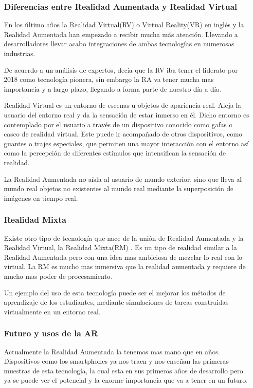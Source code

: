\subsubsection{Diferencias entre Realidad Aumentada y Realidad Virtual}
En los último años la Realidad Virtual(RV) \cite{URL::VR} o Virtual Reality(VR) en inglés y la Realidad Aumentada han empezado a recibir mucha más atención. Llevando a desarrolladores llevar acabo integraciones de ambas tecnologías en numerosas industrias.

De acuerdo a un análisis de expertos, decía que la RV iba tener el liderato por 2018 como tecnología pionera, sin embargo la RA va tener mucha mas importancia y a largo plazo, llegando a forma parte de nuestro día a día.

Realidad Virtual es un entorno de escenas u objetos de apariencia real. Aleja la usuario del entorno real y da la sensación de estar inmerso en él. Dicho entorno es contemplado por el usuario a través de un dispositivo conocido como gafas o casco de realidad virtual. Este puede ir acompañado de otros dispositivos, como guantes o trajes especiales, que permiten una mayor interacción con el entorno así como la percepción de diferentes estímulos que intensifican la sensación de realidad.

La Realidad Aumentada no aísla al usuario de mundo exterior, sino que lleva al mundo real objetos no existentes al mundo real mediante la superposición de imágenes en tiempo real.	

\subsubsection{Realidad Mixta}

Existe otro tipo de tecnología que nace de la unión de Realidad Aumentada y la Realidad Virtual, la Realidad Mixta(RM) \cite{URL::RM}. Es un tipo de realidad similar a la Realidad Aumentada pero con una idea mas ambiciosa de mezclar lo real con lo virtual. La RM es mucho mas inmersiva que la realidad aumentada y requiere de mucho mas poder de procesamiento.

Un ejemplo del uso de esta tecnología puede ser el mejorar los métodos de aprendizaje de los estudiantes, mediante simulaciones de tareas construidas virtualmente en un entorno real.  


\subsubsection{Futuro y usos de la AR}
Actualmente la Realidad Aumentada la tenemos mas mano que en años. Dispositivos como los smartphones ya nos traen y nos enseñan las primeras muestras de esta tecnología, la cual esta en sus primeros años de desarrollo pero ya se puede ver el potencial y la enorme importancia que va a tener en un futuro.

